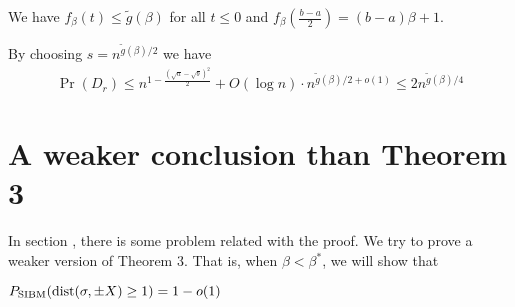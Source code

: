 \documentclass{article}
\begin{document}
We have $f_{\beta}(t) \leq \tilde{g}(\beta)$ for all $t\leq 0$ 
and $f_{\beta}(\frac{b-a}{2}) = (b-a)\beta + 1$.

By choosing $s = n^{\tilde{g}(\beta)/2}$ we have
\begin{align*}
\Pr( D_r) \leq  n^{1-\frac{(\sqrt{a}-\sqrt{b})^2}{2}} + O(\log n)  \cdot n^{\tilde{g}(\beta)/2 + o(1)} \leq 2n^{\tilde{g}(\beta)/4}
\end{align*}
\section{A weaker conclusion than Theorem 3}
In section \cite{ye2020exact}, there is some problem related with the proof. We try to prove a weaker version of Theorem 3.
That is, when $\beta < \beta^*$, we will show that
\begin{lemma}\label{lem:dist_sigma}
$P_{\operatorname{SIBM}}(\operatorname{dist}(\sigma, \pm X)\geq 1) = 1 - o(1)$
\end{lemma}
\end{document}
